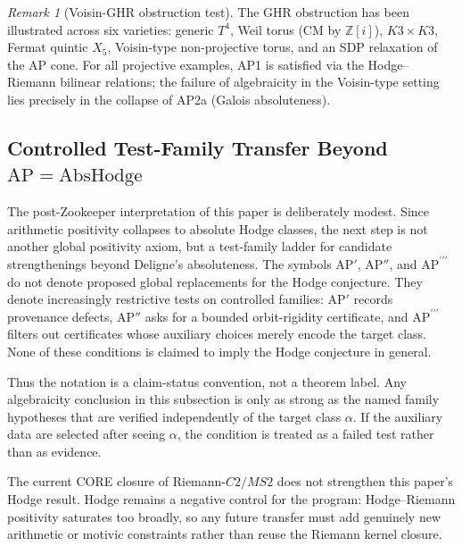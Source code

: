 \documentclass[aps,prd,twocolumn,superscriptaddress,nofootinbib]{revtex4-2}
\theoremstyle{definition}
\theoremstyle{remark}
\newtheorem{remark}[theorem]{Remark}
\begin{document}
\begin{remark}[Voisin-GHR obstruction test]
\label{rem:voisin-ghr}
The GHR obstruction has been illustrated across six varieties: generic $T^4$, Weil torus (CM by $\mathbb{Z}[i]$), $K3 \times K3$, Fermat quintic $X_5$, Voisin-type non-projective torus, and an SDP relaxation of the AP cone. For all projective examples, AP1 is satisfied via the Hodge--Riemann bilinear relations; the failure of algebraicity in the Voisin-type setting lies precisely in the collapse of AP2a (Galois absoluteness).
\end{remark}

\subsection{Controlled Test-Family Transfer Beyond \texorpdfstring{$\mathrm{AP}=\mathrm{AbsHodge}$}{AP=AbsHodge}}
\label{subsec:zookeeper-hodge-transfer}

The post-Zookeeper interpretation of this paper is deliberately modest.
Since arithmetic positivity collapses to absolute Hodge classes, the next
step is not another global positivity axiom, but a test-family ladder for
candidate strengthenings beyond Deligne's absoluteness.
The symbols $\mathrm{AP}'$, $\mathrm{AP}''$, and
$\mathrm{AP}^{\prime\prime\prime}$ do not denote proposed global
replacements for the Hodge conjecture. They denote increasingly restrictive
tests on controlled families: $\mathrm{AP}'$ records provenance defects,
$\mathrm{AP}''$ asks for a bounded orbit-rigidity certificate, and
$\mathrm{AP}^{\prime\prime\prime}$ filters out certificates whose auxiliary
choices merely encode the target class. None of these conditions is claimed
to imply the Hodge conjecture in general.

Thus the notation is a claim-status convention, not a theorem label. Any
algebraicity conclusion in this subsection is only as strong as the named
family hypotheses that are verified independently of the target class
$\alpha$. If the auxiliary data are selected after seeing $\alpha$, the
condition is treated as a failed test rather than as evidence.

The current CORE closure of Riemann-$C2/MS2$ does not strengthen this
paper's Hodge result.  Hodge remains a negative control for the program:
Hodge--Riemann positivity saturates too broadly, so any future transfer
must add genuinely new arithmetic or motivic constraints rather than reuse
the Riemann kernel closure.
\end{document}
